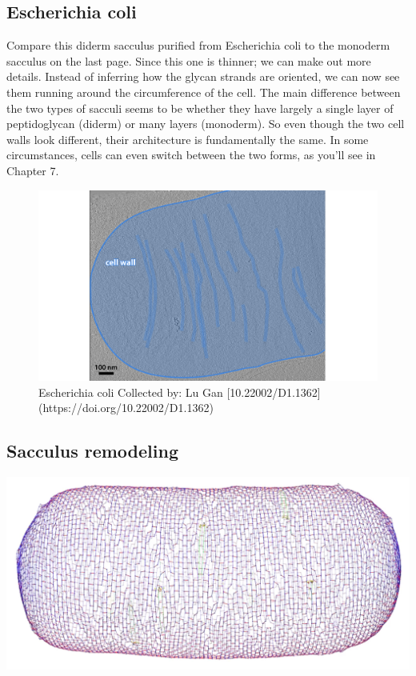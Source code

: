 \documentclass[]{tufte-book}
\begin{document}
\hypertarget{Diderm_sacculus_architecture}{\subsection{Escherichia
coli}\label{Diderm_sacculus_architecture}}

Compare this diderm sacculus purified from Escherichia coli to the
monoderm sacculus on the last page. Since this one is thinner; we can
make out more details. Instead of inferring how the glycan strands are
oriented, we can now see them running around the circumference of the
cell. The main difference between the two types of sacculi seems to be
whether they have largely a single layer of peptidoglycan (diderm) or
many layers (monoderm). So even though the two cell walls look
different, their architecture is fundamentally the same. In some
circumstances, cells can even switch between the two forms, as you'll
see in Chapter 7.

\begin{figure}
\includegraphics{img/2_3a_Ecoli} \caption[Escherichia coli Collected by]{Escherichia coli Collected by: Lu Gan [10.22002/D1.1362](https://doi.org/10.22002/D1.1362)}\label{fig:unnamed-chunk-9}
\end{figure}

\hypertarget{Sacculus_remodeling}{\subsection{Sacculus
remodeling}\label{Sacculus_remodeling}}

\includegraphics{img/02_schematic/2_3_2_SacculusRemodeling}
\end{document}

